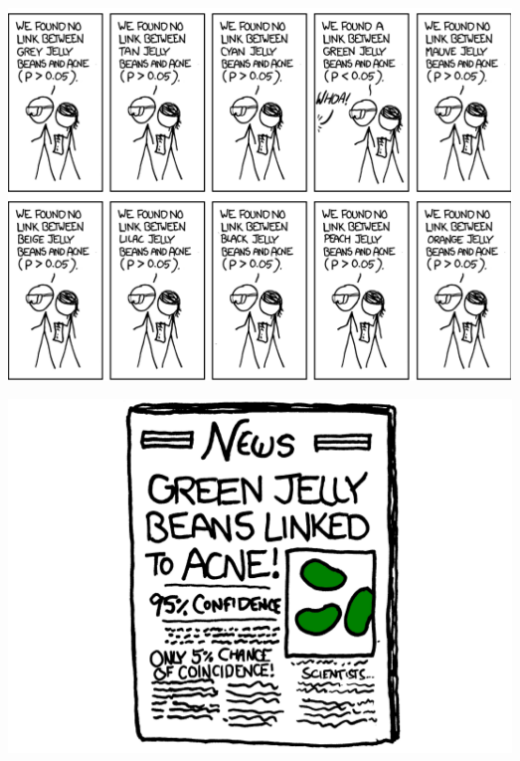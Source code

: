 \documentclass[handout]{beamer}
\begin{document}
\begin{frame}
\begin{center}
	\includegraphics[scale=0.45]{./images/xkcd3}

\end{center}
\end{frame}
\begin{frame}
\begin{center}
	\includegraphics[scale=0.45]{./images/xkcd4}

\end{center}
\end{frame}
\end{document}
